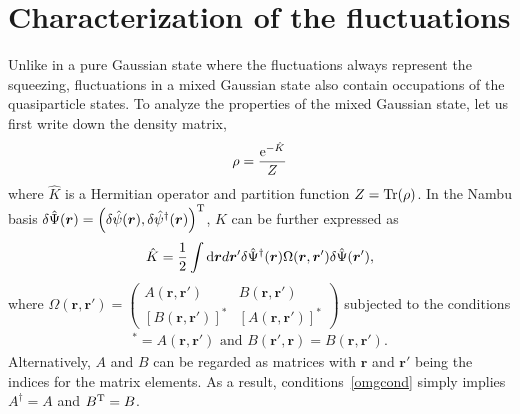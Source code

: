 \documentclass[pra,twocolumn,preprintnumbers,superscriptaddress,longbibliography,showkeys]{revtex4-1}
\begin{document}
\section{C\lowercase{haracterization of the fluctuations}}\label{secstate}
Unlike in a pure Gaussian state where the fluctuations always represent the squeezing, fluctuations in a mixed Gaussian state also contain occupations of the quasiparticle states. To analyze the properties of the mixed Gaussian state, let us first write down the density matrix,
\begin{align}
	\rho=\frac{{\rm e}^{-\hat K}}{Z}
\end{align}
where $\hat K$ is a Hermitian operator and partition function $Z={\rm Tr}(\rho)$. In the Nambu basis $\delta\hat{\Psi}({\bm r})=\left(\delta\hat{\psi}({\bm r}), \delta\hat{\psi}^{\dagger}({\bm r})\right)^{\rm T}$, $\hat K$ can be further expressed as
\begin{align}
	\hat K = \frac{1}{2} \int {\rm d}{\bm r}d{\bm r}'\delta \hat{\Psi}^{\dagger}({\bm r}) \Omega({\bm r},{\bm r}') \delta \hat{\Psi}({\bm r}'),
\end{align}
where $\Omega({\bm r},{\bm r}')=\begin{pmatrix}A({\bm r},{\bm r}')&B({\bm r},{\bm r}')\\ [B({\bm r},{\bm r}')]^*&[A({\bm r},{\bm r}')]^*\end{pmatrix}$ subjected to the conditions
\begin{align}
	[A({\bm r}',{\bm r})]^*=A({\bm r},{\bm r}')\mbox{ and }B({\bm r}',{\bm r})=B({\bm r},{\bm r}').\label{omgcond}
\end{align}
Alternatively, $A$ and $B$ can be regarded as matrices with ${\bm r}$ and ${\bm r}'$ being the indices for the matrix elements. As a result, conditions~\eqref{omgcond} simply implies $A^\dagger=A$ and $B^{\rm T}=B$.
\end{document}

